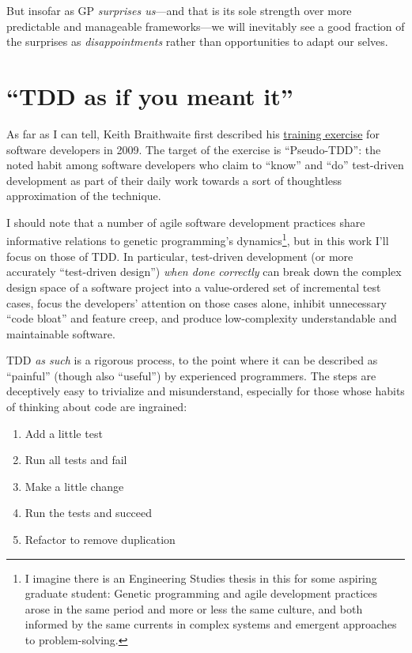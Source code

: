 But insofar as GP \emph{surprises us}---and that is its sole strength over more predictable and manageable frameworks---we will inevitably see a good fraction of the surprises as \emph{disappointments} rather than opportunities to adapt our selves.

\section{``TDD as if you meant it''}\hypertarget{tdd-as-if-you-meant-it}{}\label{tdd-as-if-you-meant-it}

As far as I can tell, Keith Braithwaite first described his \href{http://cumulative-hypotheses.org/2011/08/30/tdd-as-if-you-meant-it/}{training exercise} for software developers in 2009. The target of the exercise is ``Pseudo-TDD'': the noted habit among software developers who claim to ``know'' and ``do'' test-driven development as part of their daily work towards a sort of thoughtless approximation of the technique.

I should note that a number of agile software development practices share informative relations to genetic programming's dynamics\footnote{I imagine there is an Engineering Studies thesis in this for some aspiring graduate student: Genetic programming and agile development practices arose in the same period and more or less the same culture, and both informed by the same currents in complex systems and emergent approaches to problem-solving.}, but in this work I'll focus on those of TDD. In particular, test-driven development (or more accurately ``test-driven design'') \emph{when done correctly} can break down the complex design space of a software project into a value-ordered set of incremental test cases, focus the developers' attention on those cases alone, inhibit unnecessary ``code bloat'' and feature creep, and produce low-complexity understandable and maintainable software.

TDD \emph{as such} is a rigorous process, to the point where it can be described as ``painful'' (though also ``useful'') by experienced programmers. The steps are deceptively easy to trivialize and misunderstand, especially for those whose habits of thinking about code are ingrained:

\begin{enumerate}
\item Add a little test
\item Run all tests and fail
\item Make a little change
\item Run the tests and succeed
\item Refactor to remove duplication
\end{enumerate}

